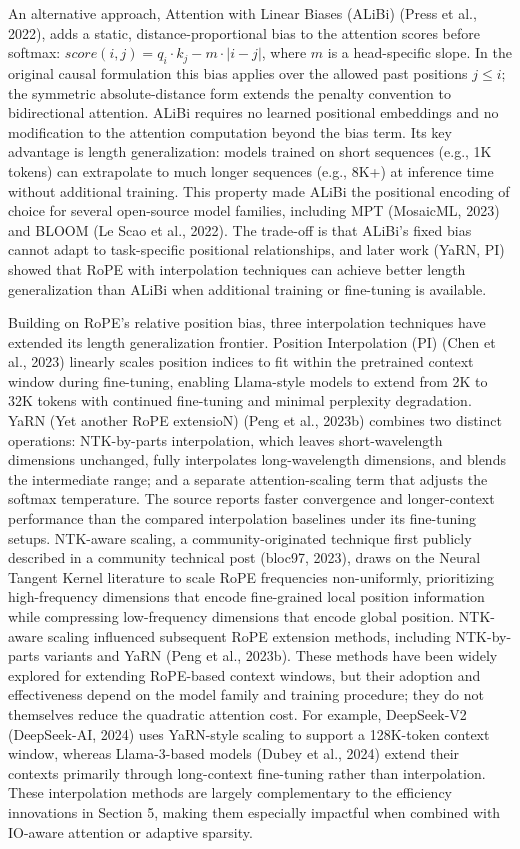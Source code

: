 \documentclass[10pt,twocolumn]{article}
\begin{document}
An alternative approach, Attention with Linear Biases (ALiBi) (Press et al., 2022), adds a static, distance-proportional bias to the attention scores before softmax: $score(i, j) = q_i \cdot k_j - m \cdot |i - j|$, where $m$ is a head-specific slope. In the original causal formulation this bias applies over the allowed past positions $j \leq i$; the symmetric absolute-distance form extends the penalty convention to bidirectional attention. ALiBi requires no learned positional embeddings and no modification to the attention computation beyond the bias term. Its key advantage is length generalization: models trained on short sequences (e.g., 1K tokens) can extrapolate to much longer sequences (e.g., 8K+) at inference time without additional training. This property made ALiBi the positional encoding of choice for several open-source model families, including MPT (MosaicML, 2023) and BLOOM (Le Scao et al., 2022). The trade-off is that ALiBi's fixed bias cannot adapt to task-specific positional relationships, and later work (YaRN, PI) showed that RoPE with interpolation techniques can achieve better length generalization than ALiBi when additional training or fine-tuning is available.

Building on RoPE's relative position bias, three interpolation techniques have extended its length generalization frontier. Position Interpolation (PI) (Chen et al., 2023) linearly scales position indices to fit within the pretrained context window during fine-tuning, enabling Llama-style models to extend from 2K to 32K tokens with continued fine-tuning and minimal perplexity degradation. YaRN (Yet another RoPE extensioN) (Peng et al., 2023b) combines two distinct operations: NTK-by-parts interpolation, which leaves short-wavelength dimensions unchanged, fully interpolates long-wavelength dimensions, and blends the intermediate range; and a separate attention-scaling term that adjusts the softmax temperature. The source reports faster convergence and longer-context performance than the compared interpolation baselines under its fine-tuning setups. NTK-aware scaling, a community-originated technique first publicly described in a community technical post (bloc97, 2023), draws on the Neural Tangent Kernel literature to scale RoPE frequencies non-uniformly, prioritizing high-frequency dimensions that encode fine-grained local position information while compressing low-frequency dimensions that encode global position. NTK-aware scaling influenced subsequent RoPE extension methods, including NTK-by-parts variants and YaRN (Peng et al., 2023b). These methods have been widely explored for extending RoPE-based context windows, but their adoption and effectiveness depend on the model family and training procedure; they do not themselves reduce the quadratic attention cost. For example, DeepSeek-V2 (DeepSeek-AI, 2024) uses YaRN-style scaling to support a 128K-token context window, whereas Llama-3-based models (Dubey et al., 2024) extend their contexts primarily through long-context fine-tuning rather than interpolation. These interpolation methods are largely complementary to the efficiency innovations in Section 5, making them especially impactful when combined with IO-aware attention or adaptive sparsity.
\end{document}

